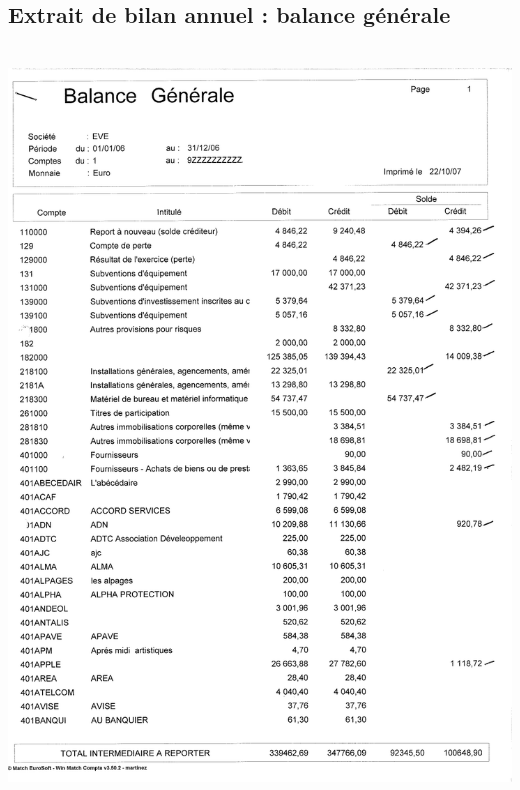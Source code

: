 \subsection{Extrait de bilan annuel : balance générale}
\begin{center}
\includegraphics[height=20cm]{annexes/images/bilan_annuel_balance_generale.pdf}
\end{center}
